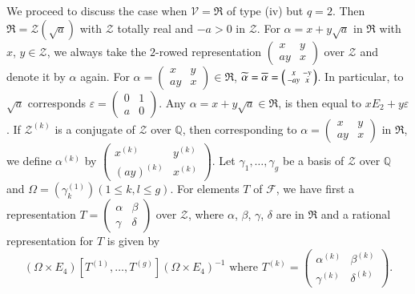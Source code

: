 We proceed to discuss the case when $\mathscr{V}=\mathfrak{R}$ of type
(iv) but $q=2$. Then $\mathfrak{R}=\mathscr{Z}(\sqrt{a})$ with
$\mathscr{Z}$ totally real and $-a>0$ in $\mathscr{Z}$. For
$\alpha=x+y\sqrt{a}$ in $\mathfrak{R}$ with $x$, $y\in\mathscr{Z}$, we
always take the $2$-rowed representation $\left(\begin{smallmatrix} x
  & y\\ ay & x\end{smallmatrix}\right)$ over $\mathscr{Z}$ and denote
  it by $\alpha$ again. For $\alpha=\left(\begin{smallmatrix} x &
    y\\ ay & x  \end{smallmatrix}\right)\in\mathfrak{R}$,
  $\widetilde{\alpha}=\overline{\alpha}=\left(\begin{smallmatrix} x &
    -y\\ -ay & x  \end{smallmatrix}\right)$. In particular, to
  $\sqrt{a}$ corresponds $\varepsilon=\left(\begin{smallmatrix} 0 & 1\\
    a & 0  \end{smallmatrix}\right)$. Any
  $\alpha=x+y\sqrt{a}\in\mathfrak{R}$, is then equal to
  $xE_{2}+y\varepsilon$. If $\mathscr{Z}^{(k)}$ is a conjugate of
  $\mathscr{Z}$ over $\mathbb{Q}$, then corresponding to
  $\alpha=\left(\begin{smallmatrix} x& y \\ ay &
  x  \end{smallmatrix}\right)$ in $\mathfrak{R}$, we define
  $\alpha^{(k)}$ by $\left(\begin{smallmatrix} x^{(k)} &
    y^{(k)}\\ (ay)^{(k)} & x^{(k)}  \end{smallmatrix}\right)$. Let
  $\gamma_{1},\ldots,\gamma_{g}$ be a basis of $\mathscr{Z}$ over
  $\mathbb{Q}$ and $\Omega=(\gamma^{(1)}_{k})(1\leq k,l\leq g)$. For
  elements $T$ of $\mathscr{F}$, we have first a representation
  $T=\left(\begin{smallmatrix} \alpha & \beta\\ \gamma & \delta
  \end{smallmatrix}\right)$ over $\mathscr{Z}$, where $\alpha$,
  $\beta$, $\gamma$, $\delta$ are in $\mathfrak{R}$ and a rational
  representation for $T$ is given by
$$
(\Omega\times E_{4})[T^{(1)},\ldots,T^{(g)}](\Omega\times
  E_{4})^{-1}\text{ \ where \ } T^{(k)}=
\begin{pmatrix}
\alpha^{(k)} & \beta^{(k)}\\
\gamma^{(k)} & \delta^{(k)}
\end{pmatrix}.
$$
